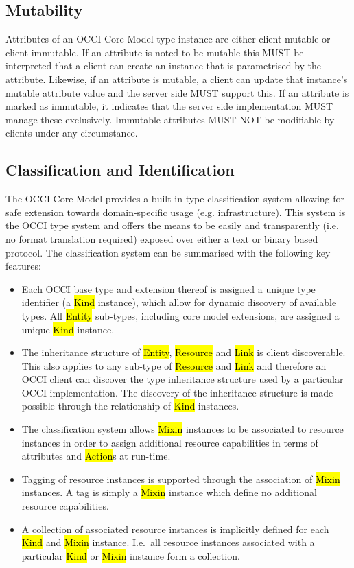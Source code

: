 \documentclass[10pt,a4paper]{article}
\begin{document}
\subsection{Mutability}

Attributes of an OCCI Core Model type instance are
either client mutable or client immutable. If an attribute is noted to
be mutable this MUST be interpreted that a client can create an
instance that is parametrised by the attribute. Likewise, if
an attribute is mutable, a client can update that instance's
mutable attribute value and the server side MUST support this. If an
attribute is marked as immutable, it indicates that the server side
implementation MUST manage these exclusively. Immutable attributes
MUST NOT be modifiable by clients under any circumstance.

\subsection{Classification and Identification}
\label{sec:classification}
The OCCI Core Model provides a built-in type classification system allowing for safe
extension towards domain-specific usage (e.g. infrastructure). This system is the OCCI type system
and offers the means to be easily and transparently (i.e. no format translation required) exposed over either a text or binary based protocol.
%
The classification system can be summarised with the following key features:
\begin{itemize}
\item Each OCCI base type and extension thereof is assigned a unique type
 identifier (a \hl{Kind} instance), which allow for dynamic discovery of
 available types. All \hl{Entity} sub-types, including core model extensions, are assigned
 a unique \hl{Kind} instance.
\item The inheritance structure of \hl{Entity}, \hl{Resource} and \hl{Link} is
 client discoverable. This also applies to any sub-type of \hl{Resource} and
 \hl{Link} and therefore an OCCI client can discover the type inheritance structure
 used by a particular OCCI implementation. The discovery of the inheritance
 structure is made possible through the relationship of \hl{Kind} instances.
\item The classification system allows \hl{Mixin} instances to be associated
 to resource instances in order to assign additional resource capabilities in terms of
 attributes and \hl{Action}s at run-time.
\item Tagging of resource instances is supported through the association
 of \hl{Mixin} instances. A tag is simply a \hl{Mixin} instance which define no
 additional resource capabilities.
\item A collection of associated resource instances is implicitly defined for
 each \hl{Kind} and \hl{Mixin} instance. I.e.~all resource instances associated
 with a particular \hl{Kind} or \hl{Mixin} instance form a collection.
\end{itemize}
\end{document}
